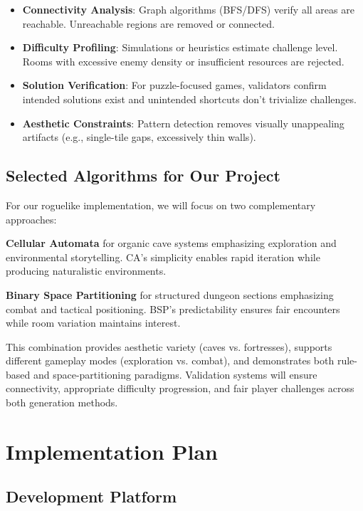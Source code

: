 \documentclass[11pt]{article}
\begin{document}
\begin{itemize}
    \item \textbf{Connectivity Analysis}: Graph algorithms (BFS/DFS) verify all areas are reachable. Unreachable regions are removed or connected.
    \item \textbf{Difficulty Profiling}: Simulations or heuristics estimate challenge level. Rooms with excessive enemy density or insufficient resources are rejected.
    \item \textbf{Solution Verification}: For puzzle-focused games, validators confirm intended solutions exist and unintended shortcuts don't trivialize challenges.
    \item \textbf{Aesthetic Constraints}: Pattern detection removes visually unappealing artifacts (e.g., single-tile gaps, excessively thin walls).
\end{itemize}

\subsection{Selected Algorithms for Our Project}

For our roguelike implementation, we will focus on two complementary approaches:

\textbf{Cellular Automata} for organic cave systems emphasizing exploration and environmental storytelling. CA's simplicity enables rapid iteration while producing naturalistic environments.

\textbf{Binary Space Partitioning} for structured dungeon sections emphasizing combat and tactical positioning. BSP's predictability ensures fair encounters while room variation maintains interest.

This combination provides aesthetic variety (caves vs. fortresses), supports different gameplay modes (exploration vs. combat), and demonstrates both rule-based and space-partitioning paradigms. Validation systems will ensure connectivity, appropriate difficulty progression, and fair player challenges across both generation methods.

\section{Implementation Plan}
\label{sec:technical}

\subsection{Development Platform}
\end{document}
